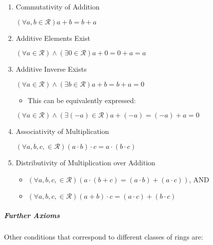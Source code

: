 \documentclass[a4paper,11pt,twoside]{article}
\begin{document}
\begin{enumerate}
\item Commutativity of Addition

\(\left( \forall a,b \in \mathcal{R}  \right) a +  b = b +  a\)

\item Additive Elements Exist

\(\left( \forall a \in \mathcal{R} \right) \wedge \left( \exists 0 \in \mathcal{R} \right) a +  0= 0 +  a =  a\)

\item Additive Inverse Exists

\(\left( \forall a \in \mathcal{R} \right)\wedge \left( \exists b \in \mathcal{R} \right) a +  b =  b +  a = 0\)

\begin{itemize}
\item This can be equivalently expressed:
\end{itemize}

\(\left( \forall a \in \mathcal{R} \right)\wedge \left( \exists \left( - a\right)\in \mathcal{R} \right) a +  \left( - a \right) = \left( - a \right) +  a = 0\)

\item Associativity of Multiplication

\(\left( \forall a,b,c, \in \mathcal{R} \right)\left( a \cdot  b \right)\cdot c = a \cdot  \left( b \cdot  c \right)\)

\item Distributivity of Multiplication over Addition

\begin{itemize}
\item \(\left( \forall a,b,c, \in \mathcal{R} \right) \left( a\cdot  \left( b+ c \right)=  \left( a \cdot   b  \right) +  \left( a \cdot   c  \right) \right)\), AND
\item \(\left( \forall a,b,c, \in \mathcal{R} \right)\left( a +  b \right)\cdot   c = \left( a \cdot   c  \right)+  \left( b \cdot   c \right)\)
\end{itemize}
\end{enumerate}
\subparagraph{Further Axioms}
\label{sec:orgea4f752}

Other conditions that correspond to different classes of rings are:
\end{document}
